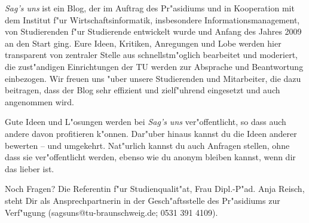 \emph{Sag's uns} ist ein Blog, der im Auftrag des Pr"asidiums und in Kooperation mit dem Institut f"ur Wirtschaftsinformatik, insbesondere Informationsmanagement, von Studierenden f"ur Studierende entwickelt wurde und Anfang des Jahres 2009 an den Start ging.
Eure Ideen, Kritiken, Anregungen und Lobe werden hier transparent von zentraler Stelle aus schnellstm"oglich bearbeitet und moderiert, die zust"andigen Einrichtungen der TU werden zur Absprache und Beantwortung einbezogen. 
Wir freuen uns "uber unsere Studierenden und Mitarbeiter, die dazu beitragen, dass der Blog sehr effizient und zielf"uhrend eingesetzt und auch angenommen wird.

Gute Ideen und L"osungen werden bei \emph{Sag's uns} ver"offentlicht, so dass auch andere davon profitieren k"onnen.
Dar"uber hinaus kannst du die Ideen anderer bewerten – und umgekehrt. Nat"urlich kannst du auch Anfragen stellen, ohne dass sie ver"offentlicht werden, ebenso wie du anonym bleiben kannst, wenn dir das lieber ist.

Noch Fragen? Die Referentin f"ur Studienqualit"at, Frau Dipl.-P"ad. Anja Reisch, steht Dir als Ansprechpartnerin in der Gesch"aftsstelle des Pr"asidiums zur Verf"ugung (sagsuns@tu-braunschweig.de; 0531 391 4109).

